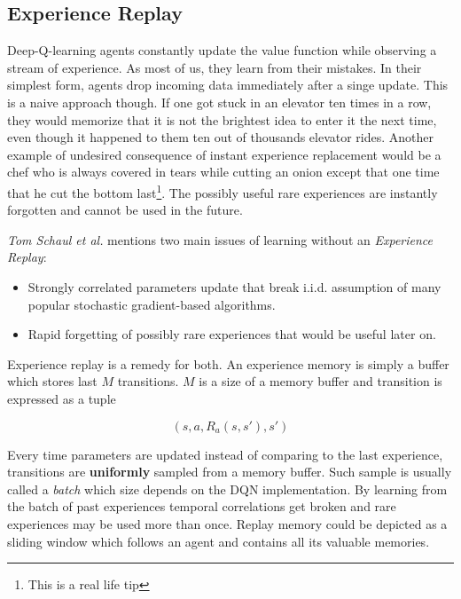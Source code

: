\subsection{Experience Replay}
\label{sub:experience-replay}

Deep-Q-learning agents constantly update the value function while observing a stream of experience. As most of us, they learn from their mistakes. In their simplest form, agents drop incoming data immediately after a singe update. This is a naive approach though. If one got stuck in an elevator ten times in a row, they would memorize that it is not the brightest idea to enter it the next time, even though it happened to them ten out of thousands elevator rides. Another example of undesired consequence of instant experience replacement would be a chef who is always covered in tears while cutting an onion except that one time that he cut the bottom last\footnote{This is a real life tip}. The possibly useful rare experiences are instantly forgotten and cannot be used in the future.

\emph{Tom Schaul et al.} \cite{schaul2015prioritized} mentions two main issues of learning without an \emph{Experience Replay}:

\begin{itemize}
    \item Strongly correlated parameters update that break i.i.d. assumption of many popular stochastic gradient-based algorithms.
    \item Rapid forgetting of possibly rare experiences that would be useful later on.
\end{itemize}

Experience replay is a remedy for both. An experience memory is simply a buffer which stores last $M$ transitions. $M$ is a size of a memory buffer and transition is expressed as a tuple

\begin{equation}
    \left(s, a, R_a(s, s'), s'\right)
\end{equation}

Every time parameters are updated instead of comparing to the last experience, transitions are \textbf{uniformly} sampled from a memory buffer. Such sample is usually called a \emph{batch} which size depends on the DQN implementation. By learning from the batch of past experiences temporal correlations get broken and rare experiences may be used more than once. Replay memory could be depicted as a sliding window which follows an agent and contains all its valuable memories. 